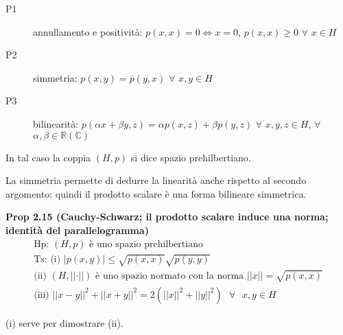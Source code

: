 \documentclass{article}
\begin{document}
\begin{description}
\item[P1] annullamento e positivit\`{a}: $p\left( x,x\right)
=0\Longleftrightarrow x=0$, $p\left( x,x\right) \geq 0$ $\forall $ $x\in H$

\item[P2] simmetria: $p\left( x,y\right) =\bar{p}\left( y,x\right) $ $%
\forall $ $x,y\in H$

\item[P3] bilinearit\`{a}: $p\left( \alpha x+\beta y,z\right) =\alpha
p\left( x,z\right) +\beta p\left( y,z\right) $ $\forall $ $x,y,z\in H$, $%
\forall $ $\alpha ,\beta \in 
\mathbb{R}
\left( 
\mathbb{C}
\right) $
\end{description}

In tal caso la coppia $\left( H,p\right) $ si dice spazio prehilbertiano.

La simmetria permette di dedurre la linearit\`{a} anche rispetto al secondo
argomento: quindi il prodotto scalare \`{e} una forma bilineare simmetrica.

\textbf{Prop 2.15 (Cauchy-Schwarz; il prodotto scalare induce una norma;
identit\`{a} del parallelogramma)}%
\begin{gather*}
\text{Hp: }\left( H,p\right) \text{ \`{e} uno spazio prehilbertiano } \\
\text{Ts: (i) }\left\vert p\left( x,y\right) \right\vert \leq \sqrt{p\left(
x,x\right) }\sqrt{p\left( y,y\right) } \\
\text{(ii) }\left( H,\left\vert \left\vert \cdot \right\vert \right\vert
\right) \text{ \`{e} uno spazio normato con la norma }\left\vert \left\vert
x\right\vert \right\vert =\sqrt{p\left( x,x\right) } \\
\text{(iii) }\left\vert \left\vert x-y\right\vert \right\vert
^{2}+\left\vert \left\vert x+y\right\vert \right\vert ^{2}=2\left(
\left\vert \left\vert x\right\vert \right\vert ^{2}+\left\vert \left\vert
y\right\vert \right\vert ^{2}\right) \text{ }\forall \text{ }x,y\in H
\end{gather*}

(i) serve per dimostrare (ii).
\end{document}

